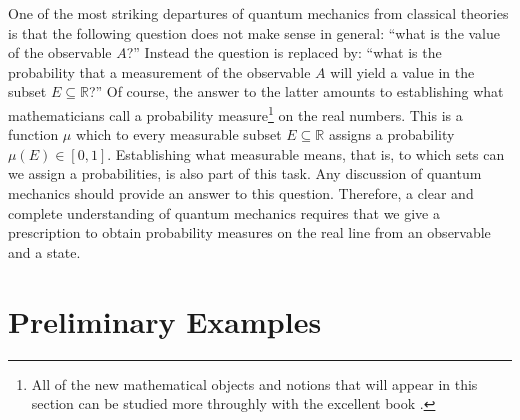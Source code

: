 \documentclass{article}
\begin{document}
One of the most striking departures of quantum mechanics from classical theories is that the following question does not make sense in general: ``what is the value of the observable $A$?'' Instead the question is replaced by: ``what is the probability that a measurement of the observable $A$ will yield a value in the subset $E\subseteq\mathbb{R}$?'' Of course, the answer to the latter amounts to establishing what mathematicians call a probability measure\footnote{All of the new mathematical objects and notions that will appear in this section can be studied more throughly with the excellent book \cite{Hall2013}.} on the real numbers. This is a function $\mu$ which to every measurable subset $E\subseteq\mathbb{R}$ assigns a probability $\mu(E)\in [0,1]$. Establishing what measurable means, that is, to which sets can we assign a probabilities, is also part of this task. Any discussion of quantum mechanics should provide an answer to this question. Therefore, a clear and complete understanding of quantum mechanics requires that we give a prescription to obtain probability measures on the real line from an observable and a state.

\section{Preliminary Examples}
\end{document}
